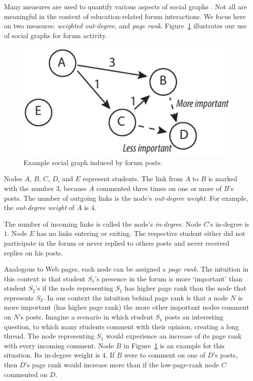 Many measures are used to quantify various aspects of social graphs
\cite{hann2005, lesk14}. Not all are meaningful in the context of
education-related forum interactions. We focus here on two measures:
{\em weighted out-degree}, and {\em page
  rank}. Figure~\ref{fig:forumGraph} illustrates our use of social
graphs for forum activity.
\begin{figure}[]
       \centering
       \includegraphics[width=1.0\textwidth]{Figs/forumNetworkExample.pdf}
       \caption{\textnormal{Example social graph induced by forum posts.}}
       \label{fig:forumGraph}
\end{figure}
Nodes $A$, $B$, $C$, $D$, and $E$ represent students. The link from
$A$ to $B$ is marked with the number $3$, because $A$ commented three
times on one or more of $B$'s posts. The number of outgoing links is
the node's {\em out-degree weight}. For example, the {\em out-degree
  weight} of $A$ is $4$.

The number of incoming links is called the node's {\em
  in-degree}. Node $C$'s in-degree is $1$. Node $E$ has no links
entering or exiting. The respective student either did not participate in
the forum or never replied to others posts and never received replies on his posts.

Analogous to Web pages, each node can be assigned a {\em page
  rank}. The intuition in this context is that student $S_1$'s
presence in the forum is more `important' than student $S_2$'s if the
node representing $S_1$ has higher page rank than the node that
represents $S_2$. In our context the intuition behind page rank is
that a node $N$ is more important (has higher page rank) the more
other important nodes comment on $N$'s posts. Imagine a scenario in
which student $S_1$ posts an interesting question, to which many
students comment with their opinion, creating a long thread. The node
representing $S_1$ would experience an increase of its page rank with
every incoming comment. Node $B$ in Figure~\ref{fig:forumGraph} is an
example for this situation. Its in-degree weight is $4$. If $B$ were
to comment on one of $D$'s posts, then $D$'s page rank would increase
more than if the low-page-rank node $C$ commented on $D$.

